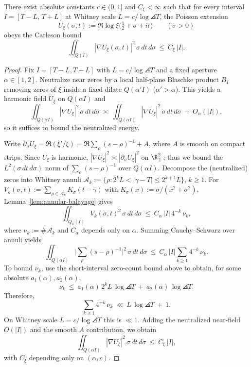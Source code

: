\begin{lemma}\label{lem:carleson-xi}
There exist absolute constants \(c\in(0,1]\) and \(C_\xi<\infty\) such that for every interval \(I=[T-L,\,T+L]\) at Whitney scale \(L=c/\log\angles{T}\), the Poisson extension
\[
 U_{\xi}(\sigma,t):=\Re\log\xi\big(\tfrac12+\sigma+it\big)\qquad(\sigma>0)
\]
obeys the Carleson bound
\[
  \iint_{Q(I)} |\nabla U_{\xi}(\sigma,t)|^2\,\sigma\,dt\,d\sigma\ \le\ C_\xi\,|I|.
\]
\end{lemma}
\begin{proof}
Fix \(I=[T-L,T+L]\) with \(L=c/\log\angles{T}\) and a fixed aperture \(\alpha\in[1,2]\).
Neutralize near zeros by a local half-plane Blaschke product \(B_I\) removing zeros of \(\xi\) inside a fixed dilate \(Q(\alpha'I)\) (\(\alpha'>\alpha\)).
This yields a harmonic field \(\widetilde U_\xi\) on \(Q(\alpha I)\) and
\[
  \iint_{Q(\alpha I)} |\nabla U_\xi|^2\,\sigma\,dt\,d\sigma
  \ \asymp\
  \iint_{Q(\alpha I)} |\nabla \widetilde U_\xi|^2\,\sigma\,dt\,d\sigma\ +\ O_\alpha(|I|),
\]
so it suffices to bound the neutralized energy.

Write \(\partial_\sigma U_\xi=\Re(\xi'/\xi)=\Re\sum_\rho (s-\rho)^{-1}+A\), where \(A\) is smooth on compact strips.
Since \(U_\xi\) is harmonic, \(|\nabla U_\xi|^2\asymp |\partial_\sigma U_\xi|^2\) on \(\R^2_+\); thus we bound the \(L^2(\sigma\,dt\,d\sigma)\) norm of \(\sum_\rho (s-\rho)^{-1}\) over \(Q(\alpha I)\).
Decompose the (neutralized) zeros into Whitney annuli
\(
\mathcal A_k:=\{\rho:2^kL<|\gamma-T|\le 2^{k+1}L\}
\), \(k\ge 1\).
For \(V_k(\sigma,t):=\sum_{\rho\in\mathcal A_k} K_\sigma(t-\gamma)\) with \(K_\sigma(x):=\sigma/(x^2+\sigma^2)\), Lemma~\ref{lem:annular-balayage} gives
\[
  \iint_{Q_\alpha(I)} V_k(\sigma,t)^2\,\sigma\,dt\,d\sigma\ \le\ C_\alpha\,|I|\,4^{-k}\,\nu_k,
\]
where \(\nu_k:=\#\mathcal A_k\) and \(C_\alpha\) depends only on \(\alpha\).
Summing Cauchy--Schwarz over annuli yields
\[
  \iint_{Q(\alpha I)} \Big|\sum_{\rho}(s-\rho)^{-1}\Big|^2\,\sigma\,dt\,d\sigma
  \ \le\ C_\alpha\,|I|\sum_{k\ge 1}4^{-k}\,\nu_k.
\]
To bound \(\nu_k\), use the short-interval zero-count bound above to obtain, for some absolute \(a_1(\alpha),a_2(\alpha)\),
\[
  \nu_k\ \le\ a_1(\alpha)\,2^k L\,\log\angles{T}\ +\ a_2(\alpha)\,\log\angles{T}.
\]
Therefore,
\[
  \sum_{k\ge1}4^{-k}\,\nu_k\ \ll\ L\,\log\angles{T}\ +\ 1.
\]
On Whitney scale \(L=c/\log\angles{T}\) this is \(\ll 1\).
Adding the neutralized near-field \(O(|I|)\) and the smooth \(A\) contribution, we obtain
\[
  \iint_{Q(\alpha I)} |\nabla U_\xi|^2\,\sigma\,dt\,d\sigma\ \le\ C_\xi\,|I|,
\]
with \(C_\xi\) depending only on \((\alpha,c)\).
\end{proof}

